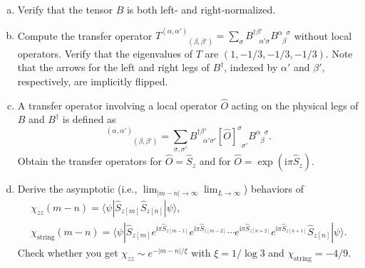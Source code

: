 \documentclass[11pt,a4paper,oneside]{article}
\begin{document}
\begin{enumerate}[(a)]

\item
Verify that the tensor $B$ is both left- and right-normalized.

\item
Compute the transfer operator $T^{(\alpha, \alpha')}_{\phantom{(\alpha, \alpha')} (\beta, \beta')} = \sum_{\sigma} B^{\dagger \beta'}_{\phantom{\beta'} \alpha'  \sigma} B^{\alpha \phantom{\beta} \sigma}_{\phantom{\alpha} \beta}$ without local operators.
Verify that the eigenvalues of $T$ are $(1, -1/3, -1/3, -1/3)$.
Note that the arrows for the left and right legs of $B^\dagger$, indexed by $\alpha'$ and $\beta'$, respectively, are implicitly flipped.

\item
A transfer operator involving a local operator $\hat{O}$ acting on the physical legs of $B$ and $B^\dagger$ is defined as
\begin{equation}
[T_{\hat{O}}]^{(\alpha, \alpha')}_{\phantom{(\alpha, \alpha')} (\beta, \beta')} 
= \sum_{\sigma, \sigma'} B^{\dagger \beta'}_{\phantom{\beta'} \alpha'  \sigma'}
[\hat{O}]^{\sigma}_{\phantom{\sigma} \sigma'}
B^{\alpha \phantom{\beta} \sigma}_{\phantom{\alpha} \beta} .
\end{equation}
Obtain the transfer operators for $\hat{O} = \hat{S}_z$ and for $\hat{O} = \exp (\mathrm{i} \pi \hat{S}_z)$.

\item 
Derive the asymptotic (i.e., $\lim_{|m - n| \to \infty} \lim_{L \to \infty}$) behaviors of
\begin{equation}
\begin{gathered}
\chi_{zz} (m - n) = \langle \psi | \hat{S}_{z [m]} \hat{S}_{z [n]} | \psi \rangle,
\\
\chi_\mathrm{string} (m - n) = \langle \psi | \hat{S}_{z [m]}
e^{\mathrm{i} \pi \hat{S}_{z[m-1]}}
e^{\mathrm{i} \pi \hat{S}_{z[m-2]}}
\cdots
e^{\mathrm{i} \pi \hat{S}_{z[n+2]}}
e^{\mathrm{i} \pi \hat{S}_{z[n+1]}}
\hat{S}_{z [n]} | \psi \rangle .
\end{gathered}
\end{equation}
Check whether you get $\chi_{zz} \sim e^{- |m - n| / \xi}$ with $\xi = 1/\log 3$ and $\chi_\mathrm{string} = -4/9$.

\end{enumerate}
\end{document}
